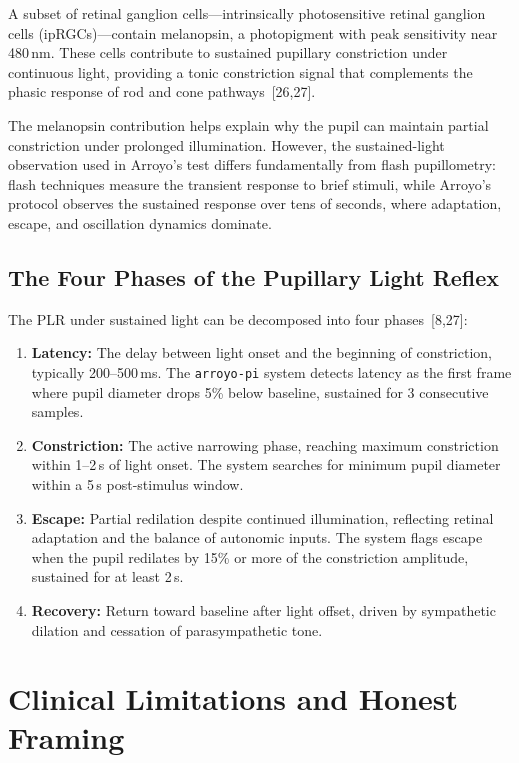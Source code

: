 \documentclass[11pt]{article}
\begin{document}
A subset of retinal ganglion cells---intrinsically photosensitive retinal
ganglion cells (ipRGCs)---contain melanopsin, a photopigment with peak
sensitivity near 480\,nm. These cells contribute to sustained pupillary
constriction under continuous light, providing a tonic constriction signal
that complements the phasic response of rod and cone pathways~[26,27].

The melanopsin contribution helps explain why the pupil can maintain partial
constriction under prolonged illumination. However, the sustained-light
observation used in Arroyo's test differs fundamentally from flash
pupillometry: flash techniques measure the transient response to brief
stimuli, while Arroyo's protocol observes the sustained response over tens of
seconds, where adaptation, escape, and oscillation dynamics dominate.

\subsection{The Four Phases of the Pupillary Light Reflex}

The PLR under sustained light can be decomposed into four phases~[8,27]:

\begin{enumerate}
  \item \textbf{Latency:} The delay between light onset and the beginning of
        constriction, typically 200--500\,ms. The \texttt{arroyo-pi} system
        detects latency as the first frame where pupil diameter drops 5\%
        below baseline, sustained for 3 consecutive samples.
  \item \textbf{Constriction:} The active narrowing phase, reaching maximum
        constriction within 1--2\,s of light onset. The system searches for
        minimum pupil diameter within a 5\,s post-stimulus window.
  \item \textbf{Escape:} Partial redilation despite continued illumination,
        reflecting retinal adaptation and the balance of autonomic inputs.
        The system flags escape when the pupil redilates by 15\% or more of
        the constriction amplitude, sustained for at least 2\,s.
  \item \textbf{Recovery:} Return toward baseline after light offset, driven
        by sympathetic dilation and cessation of parasympathetic tone.
\end{enumerate}

\section{Clinical Limitations and Honest Framing}
\end{document}
